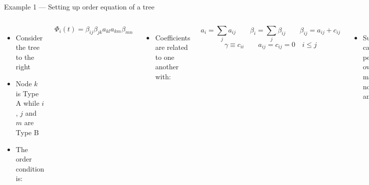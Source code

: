 \documentclass[serif]{beamer}
\begin{document}
\begin{frame}{Example 1 --- Setting up order equation of a tree}
  \label{slide:tree}
  \begin{columns}[T]
  \begin{itemize}
  \item<1-> Consider the tree to the right
  \item<1-> Node $k$ is Type A while $i$, $j$ and $m$ are Type B
  \item<1-> The order condition is:
  \end{itemize}
  \begin{equation}
    \nonumber
    \Phi_i\left(t\right) = \beta_{ij}\beta_{jk}a_{kl}a_{km}\beta_{mn}
  \end{equation}\vspace{-0.5cm}
  \begin{itemize}
  \item<1-> Coefficients are related to one another with:
  \end{itemize}
  \begin{equation}
    \nonumber
    a_i = \sum_j a_{ij} \qquad \beta_i = \sum_j \beta_{ij} \qquad \beta_{ij} = a_{ij} + c_{ij}
  \end{equation} \vspace{-0.4cm}
  \begin{equation}
    \nonumber
    \gamma \equiv c_{ii} \qquad a_{ij} = c_{ij}=0 \quad i \le j
  \end{equation}
  \vspace{-0.5cm}
  \begin{itemize}
  \item<1-> Summation can be performed over maximal nodes $l$ and $n$:
  \end{itemize}
  \begin{equation}
    \nonumber
    \Phi_i\left(t\right) = \beta_{ij}\beta_{jk}a_{k}a_{km}\beta_{m}
  \end{equation}
  \vspace{0.8cm}
  \end{columns}
\end{frame}
\end{document}
